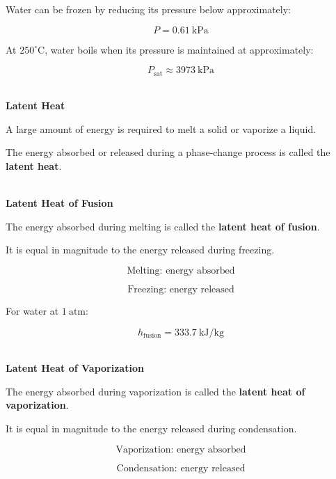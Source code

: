 \documentclass[12pt]{article}
\begin{document}
Water can be frozen by reducing its pressure below approximately:

\begin{equation*}
P=0.61~\mathrm{kPa}
\end{equation*}

At $250^\circ\mathrm{C}$, water boils when its pressure is maintained at approximately:

\begin{equation*}
P_{\mathrm{sat}}\approx3973~\mathrm{kPa}
\end{equation*}

\textbf{\\ Latent Heat}

A large amount of energy is required to melt a solid or vaporize a liquid.

The energy absorbed or released during a phase-change process is called the \textbf{latent heat}.

\textbf{\\ Latent Heat of Fusion}

The energy absorbed during melting is called the \textbf{latent heat of fusion}.

It is equal in magnitude to the energy released during freezing.

\begin{equation*}
\boxed{\text{Melting: energy absorbed}}
\end{equation*}

\begin{equation*}
\boxed{\text{Freezing: energy released}}
\end{equation*}

For water at $1~\mathrm{atm}$:

\begin{equation*}
h_{\mathrm{fusion}}=333.7~\mathrm{kJ/kg}
\end{equation*}

\textbf{\\ Latent Heat of Vaporization}

The energy absorbed during vaporization is called the \textbf{latent heat of vaporization}.

It is equal in magnitude to the energy released during condensation.

\begin{equation*}
\boxed{\text{Vaporization: energy absorbed}}
\end{equation*}

\begin{equation*}
\boxed{\text{Condensation: energy released}}
\end{equation*}
\end{document}
